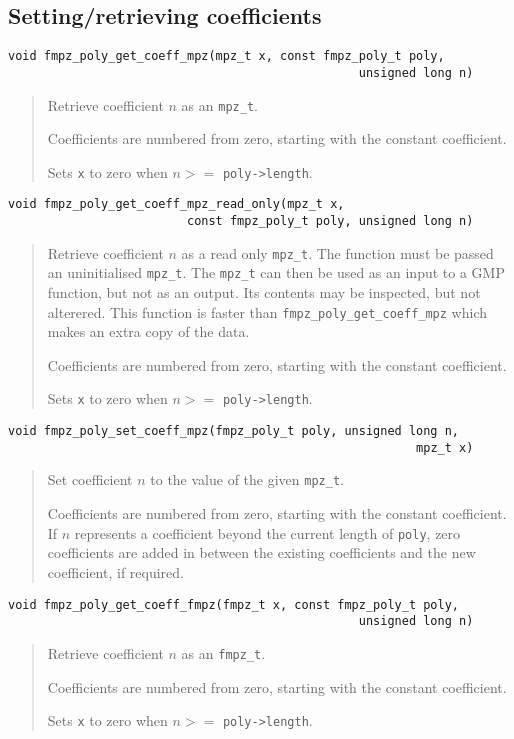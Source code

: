 \documentclass[a4paper,10pt]{article}
\newcommand{\code}{\lstinline}
\begin{document}
\subsection{Setting/retrieving coefficients}

\begin{lstlisting}
void fmpz_poly_get_coeff_mpz(mpz_t x, const fmpz_poly_t poly, 
                                                 unsigned long n)
\end{lstlisting}
\begin{quote}
Retrieve coefficient $n$ as an \code{mpz_t}. 

Coefficients are numbered from zero, starting with the constant coefficient.

Sets \code{x} to zero when $n >= $ \code{poly->length}. 
\end{quote}

\begin{lstlisting}
void fmpz_poly_get_coeff_mpz_read_only(mpz_t x, 
                         const fmpz_poly_t poly, unsigned long n)
\end{lstlisting}
\begin{quote}
Retrieve coefficient $n$ as a read only \code{mpz_t}. The function must be passed an uninitialised \code{mpz_t}. The \code{mpz_t} can then be used as an input to a GMP function, but not as an output. Its contents may be inspected, but not alterered. This function is faster than \code{fmpz_poly_get_coeff_mpz} which makes an extra copy of the data. 

Coefficients are numbered from zero, starting with the constant coefficient.

Sets \code{x} to zero when $n >= $ \code{poly->length}. 
\end{quote}

\begin{lstlisting}
void fmpz_poly_set_coeff_mpz(fmpz_poly_t poly, unsigned long n, 
                                                         mpz_t x) 
\end{lstlisting}
\begin{quote}
Set coefficient $n$ to the value of the given \code{mpz_t}. 

Coefficients are numbered from zero, starting with the constant coefficient. If $n$ represents a coefficient beyond the current length of \code{poly}, zero coefficients are added in between the existing coefficients and the new coefficient, if required.
\end{quote}

\begin{lstlisting}
void fmpz_poly_get_coeff_fmpz(fmpz_t x, const fmpz_poly_t poly, 
                                                 unsigned long n)
\end{lstlisting}
\begin{quote}
Retrieve coefficient $n$ as an \code{fmpz_t}. 

Coefficients are numbered from zero, starting with the constant coefficient.

Sets \code{x} to zero when $n >= $ \code{poly->length}. 
\end{quote}
\end{document}
